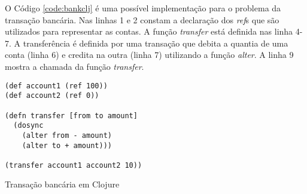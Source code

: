 O Código \ref{code:bankclj} é uma possível implementação para o problema da transação bancária. Nas linhas 1 e 2 constam a declaração dos \emph{ref}s que são utilizados para representar as contas. A função \emph{transfer} está definida nas linha 4-7. A transferência é definida por uma transação que debita a quantia de uma conta (linha 6) e credita na outra (linha 7) utilizando a função \emph{alter}. A linha 9 mostra a chamada da função \emph{transfer}.

\begin{listing}
  \begin{verbatim}
(def account1 (ref 100))
(def account2 (ref 0))

(defn transfer [from to amount]
  (dosync 
    (alter from - amount)
    (alter to + amount)))

(transfer account1 account2 10))
  \end{verbatim}
  \caption{Transação bancária em Clojure}
  \label{code:bankclj}
\end{listing}